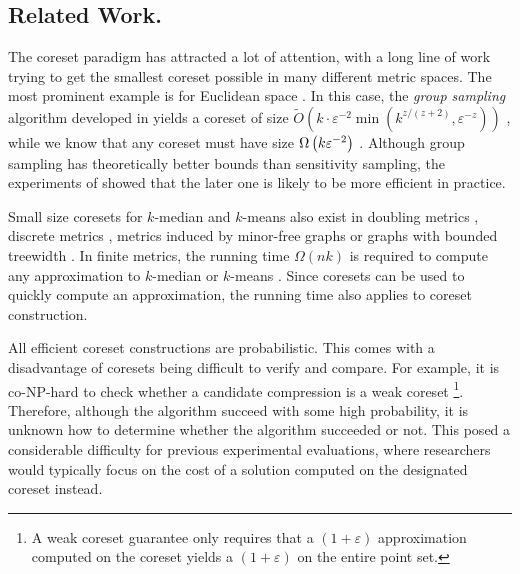 \subsection{Related Work.}

The coreset paradigm has attracted a lot of attention, with a long line of work trying to get the smallest coreset possible in many different metric spaces. The most prominent example is for Euclidean space \cite{BadoiuHI02, HaM04, Chen09, HuangV20, stoc22}. 
In this case, the \textit{group sampling} algorithm developed in \cite{stoc21, stoc22} yields a coreset of size $\tilde{O}(k\cdot \varepsilon^{-2} \min(k^{z/(z+2)},\varepsilon^{-z}))$ \cite{CLSSS22}, while we know that any coreset must have size $\Omega \left( k\varepsilon^{-2}\right)$ \cite{stoc22}.
Although group sampling has theoretically better bounds than sensitivity sampling, the experiments of \cite{chrisESA} showed that the later one is likely to be more efficient in practice.

Small size coresets for $k$-median and $k$-means also exist in doubling metrics \cite{huang2018varepsilon}, discrete metrics \cite{FeldmanL11}, metrics induced by minor-free graphs \cite{BravermanJKW21} or graphs with bounded treewidth \cite{baker2020coresets}. 
In finite metrics, the running time $\Omega(nk)$ is required to compute any approximation to $k$-median or $k$-means \cite{mettu2004optimal}. Since coresets can be used to quickly compute an approximation, the running time also applies to coreset construction. 


All efficient coreset constructions are probabilistic. This comes with a disadvantage of coresets being difficult to verify and compare. For example, it is co-NP-hard to check whether a candidate compression is a weak coreset \cite{chrisESA} \footnote{A weak coreset guarantee only requires that a $(1+\varepsilon)$ approximation computed on the coreset yields a $(1+\varepsilon)$ on the entire point set.}. Therefore, although the algorithm succeed with some high probability, it is unknown how to determine whether the algorithm succeeded or not. 
This posed a considerable difficulty for previous experimental evaluations, where researchers would typically focus on the cost of a solution computed on the designated coreset instead.


